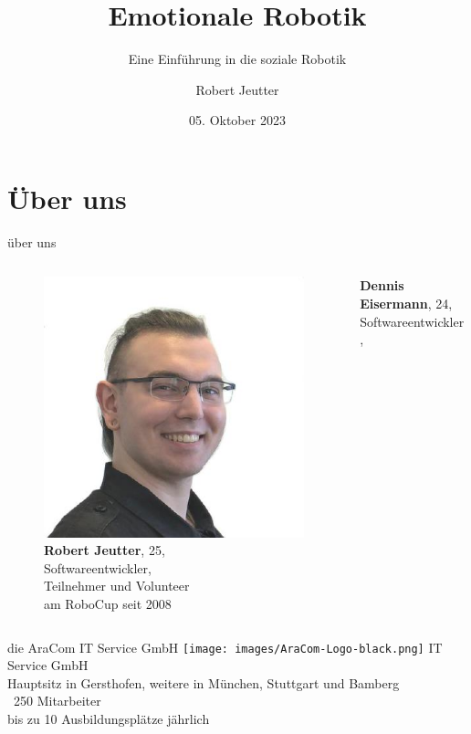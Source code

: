 \documentclass[aspectratio=169]{beamer}
\title{Emotionale Robotik}
\subtitle{Eine Einführung in die soziale Robotik}
\author{Robert Jeutter}
\date{05. Oktober 2023}
\begin{document}
\maketitle

\section{Über uns}
\begin{frame}{über uns}
  \begin{columns}
    \begin{column}{0.45\textwidth}
      \begin{figure}[h]
        \centering
        \includegraphics[width=.6\linewidth]{images/robert_jeutter.jpeg}\\
        \textbf{Robert Jeutter}, 25,\\
        Softwareentwickler,\\
        \scriptsize{Teilnehmer und Volunteer\\ am RoboCup seit 2008}
      \end{figure}
    \end{column}
    \begin{column}{0.45\textwidth}
      \textbf{Dennis Eisermann}, 24,\\
      Softwareentwickler,\\
    \end{column}
  \end{columns}
\end{frame}
\begin{frame}{die AraCom IT Service GmbH}
  \texttt{[image: images/AraCom-Logo-black.png]}
  IT Service GmbH\\
  Hauptsitz in Gersthofen, weitere in München, Stuttgart und Bamberg\\
  ~250 Mitarbeiter\\
  bis zu 10 Ausbildungsplätze jährlich
\end{frame}
\end{document}
